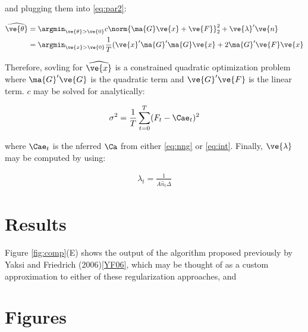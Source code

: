 \documentclass[12pt]{article}
\begin{document}
\noindent and plugging them into \eqref{eq:par2}:

\begin{align}
\widehat{\ve{\theta}} &=\argmin_{\ve{\theta}>\ve{0}} c\norm{\ma{G} \ve{x} + \ve{F}}_2^2 + \ve{\lambda}' \ve{n} \\
&=\argmin_{\ve{x}>\ve{0}} \frac{1}{T} (\ve{x}' \ma{G}'\ma{G} \ve{x} + 2 \ma{G}'\ve{F} \ve{x}
\end{align}

Therefore, sovling for $\widehat{\ve{x}}$ is a constrained quadratic optimization problem where $\ma{G}'\ve{G}$ is the quadratic term and $\ve{G}'\ve{F}$ is the linear term.  $c$ may be solved for analytically:

\begin{align}
\sigma^2 = \frac{1}{T} \sum_{t=0}^T (F_t - \Cae_t)^2
\end{align}

\noindent where $\Cae_t$ is the nferred $\Ca$ from either \eqref{eq:nng} or \eqref{eq:int}. Finally, $\ve{\lambda}$ may be computed by using:

\begin{align}
\lambda_t = \frac{1}{\widehat{A}\widehat{n}_t \Delta}
\end{align}

\section{Results} \label{sec:results}

Figure \ref{fig:comp}(E) shows the output of the algorithm proposed previously by Yaksi and Friedrich (2006)\ref{YF06}, which may be thought of as a custom approximation to either of these regularization approaches, and


\clearpage
\section{Figures}
\end{document}
